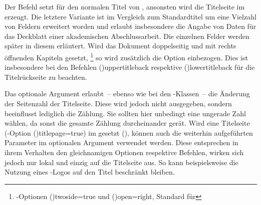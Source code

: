 \begin{DeclareEntity*}{}
\begin{DeclareEntity*}{}
\begin{DeclareEntity*}{}
\begin{Declaration}
\begin{Declaration}
\begin{Declaration}
\begin{Declaration}
\begin{Declaration}
\begin{Declaration}
\begin{Declaration}
\begin{Declaration}
\begin{Declaration}
\begin{Declaration}
\begin{Declaration}
Der Befehl  setzt für  den normalen 
Titel von \KOMAScript, ansonsten wird die Titelseite im \TUDCD erzeugt. Die 
letztere Variante ist im Vergleich zum Standardtitel um eine Vielzahl von 
Feldern erweitert worden und erlaubt insbesondere die Angabe von Daten für das 
Deckblatt einer akademischen Abschlussarbeit. Die einzelnen Felder werden 
später in diesem \autorefname erläutert. Wird das Dokument doppelseitig und mit 
rechts öffnenden Kapiteln gesetzt,%
\footnote{%
  \KOMAScript-Optionen \Option(){twoside=true} und 
  \Option(){open=right},
  Standard für %
}
so wird zusätzlich die Option  einbezogen. Dies 
ist insbesondere bei den Befehlen \Macro(){uppertitleback} 
respektive \Macro(){lowertitleback} für die Titelrückseite 
zu beachten.

Das optionale Argument erlaubt~-- ebenso wie bei den \KOMAScript-Klassen~-- 
die Änderung der Seitenzahl der Titelseite. Diese wird jedoch nicht ausgegeben, 
sondern beeinflusst lediglich die Zählung. Sie sollten hier unbedingt eine 
ungerade Zahl wählen, da sonst die gesamte Zählung durcheinander gerät. 
Wird eine Titelseite
(\KOMAScript-Option \Option(){titlepage=true}) im
\TUDCD gesetzt (), können auch die weiterhin aufgeführten
Parameter im optionalen Argument verwendet werden. Diese entsprechen in ihrem 
Verhalten den gleichnamigen Optionen respektive Befehlen, wirken sich jedoch 
nur lokal und einzig auf die Titelseite aus. So kann beispielsweise die Nutzung 
eines \DDC-Logos auf den Titel beschränkt bleiben.
\end{Declaration}
\end{Declaration}
\end{Declaration}
\end{Declaration}
\end{Declaration}
\end{Declaration}
\end{Declaration}
\end{Declaration}
\end{Declaration}
\end{Declaration}
\end{Declaration}

\begin{Declaration}
  {}


\end{Declaration}
\end{DeclareEntity*}
\end{DeclareEntity*}
\end{DeclareEntity*}
